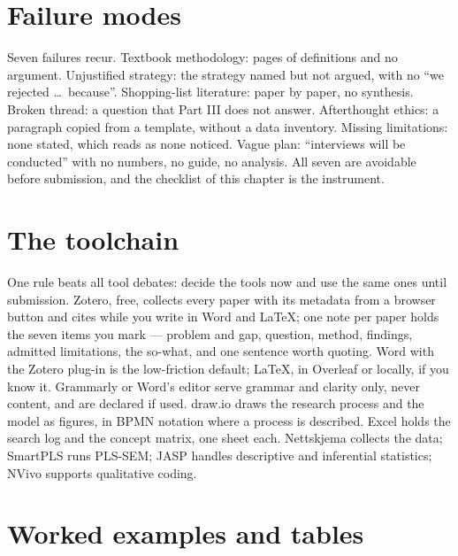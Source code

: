 \documentclass[11pt,a4paper,british,twoside=false,headings=small,chapterprefix=false,numbers=noenddot]{scrbook}
\begin{document}
\section{Failure modes}

Seven failures recur. Textbook methodology: pages of definitions and no argument. Unjustified strategy: the strategy named but not argued, with no ``we rejected \dots\ because''. Shopping-list literature: paper by paper, no synthesis. Broken thread: a question that Part III does not answer. Afterthought ethics: a paragraph copied from a template, without a data inventory. Missing limitations: none stated, which reads as none noticed. Vague plan: ``interviews will be conducted'' with no numbers, no guide, no analysis. All seven are avoidable before submission, and the checklist of this chapter is the instrument.

\section{The toolchain}

One rule beats all tool debates: decide the tools now and use the same ones until submission. Zotero, free, collects every paper with its metadata from a browser button and cites while you write in Word and LaTeX; one note per paper holds the seven items you mark --- problem and gap, question, method, findings, admitted limitations, the so-what, and one sentence worth quoting. Word with the Zotero plug-in is the low-friction default; LaTeX, in Overleaf or locally, if you know it. Grammarly or Word's editor serve grammar and clarity only, never content, and are declared if used. draw.io draws the research process and the model as figures, in BPMN notation where a process is described. Excel holds the search log and the concept matrix, one sheet each. Nettskjema collects the data; SmartPLS runs PLS-SEM; JASP handles descriptive and inferential statistics; NVivo supports qualitative coding.


\section{Worked examples and tables}
\end{document}
